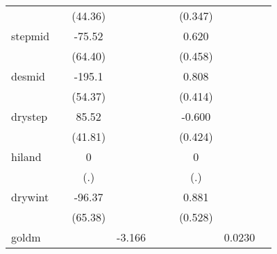 {\begin{tabular}{l*{8}{c}}
            &                     &     (44.36)         &                     &                     &                     &     (0.347)         &                     &                     \\
[1em]
stepmid     &                     &      -75.52         &                     &                     &                     &       0.620         &                     &                     \\
            &                     &     (64.40)         &                     &                     &                     &     (0.458)         &                     &                     \\
[1em]
desmid      &                     &      -195.1\sym{***}&                     &                     &                     &       0.808\sym{*}  &                     &                     \\
            &                     &     (54.37)         &                     &                     &                     &     (0.414)         &                     &                     \\
[1em]
drystep     &                     &       85.52\sym{**} &                     &                     &                     &      -0.600         &                     &                     \\
            &                     &     (41.81)         &                     &                     &                     &     (0.424)         &                     &                     \\
[1em]
hiland      &                     &           0         &                     &                     &                     &           0         &                     &                     \\
            &                     &         (.)         &                     &                     &                     &         (.)         &                     &                     \\
[1em]
drywint     &                     &      -96.37         &                     &                     &                     &       0.881\sym{*}  &                     &                     \\
            &                     &     (65.38)         &                     &                     &                     &     (0.528)         &                     &                     \\
[1em]
goldm       &                     &                     &      -3.166\sym{***}&                     &                     &                     &      0.0230\sym{***}&                     \\

\end{tabular}}
